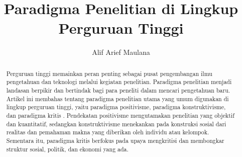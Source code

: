 \documentclass[10pt, a4paper]{article}
\begin{document}
\title{\textbf{Paradigma Penelitian di Lingkup Perguruan Tinggi}}
\author{Alif Arief Maulana}

\maketitle


\begin{abstract}
    Perguruan tinggi memainkan peran penting sebagai pusat pengembangan ilmu pengetahuan dan teknologi melalui kegiatan penelitian. Paradigma penelitian menjadi landasan berpikir dan bertindak bagi para peneliti dalam mencari pengetahuan baru. Artikel ini membahas tentang paradigma penelitian utama yang umum digunakan di lingkup perguruan tinggi, yaitu paradigma positivisme, paradigma konstruktivisme, dan paradigma kritis \cite{creswell2014research, guba1994competing, smith1983quantitative}. Pendekatan positivisme mengutamakan penelitian yang objektif dan kuantitatif, sedangkan konstruktivisme menekankan pada konstruksi sosial dari realitas dan pemahaman makna yang diberikan oleh individu atau kelompok. Sementara itu, paradigma kritis berfokus pada upaya mengkritisi dan membongkar struktur sosial, politik, dan ekonomi yang ada.

\end{abstract}







\printbibliography
\end{document}
